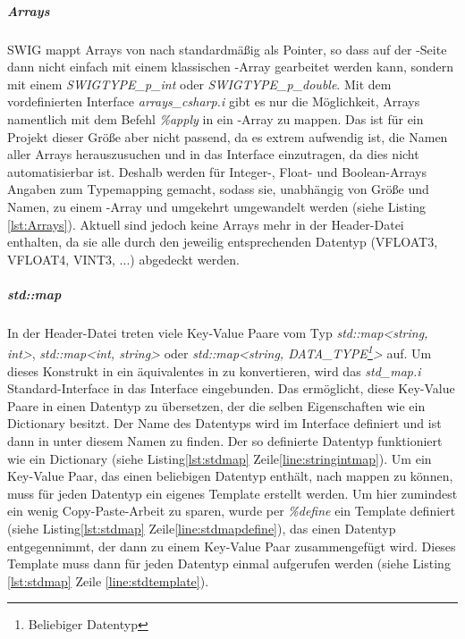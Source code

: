 \subparagraph{Arrays}
SWIG mappt Arrays von \CC nach \CS standardmäßig als Pointer, so dass auf der \CS-Seite dann nicht einfach mit einem klassischen \CS-Array gearbeitet werden kann, sondern mit einem \emph{SWIGTYPE\_p\_int} oder \emph{SWIGTYPE\_p\_double}. Mit dem vordefinierten Interface \emph{arrays\_csharp.i} gibt es nur die Möglichkeit, Arrays namentlich mit dem Befehl \emph{\%apply} in ein \CS-Array zu mappen. Das ist für ein Projekt dieser Größe aber nicht passend, da es extrem aufwendig ist, die Namen aller Arrays herauszusuchen und in das Interface einzutragen, da dies nicht automatisierbar ist. Deshalb werden für Integer-, Float- und Boolean-Arrays Angaben zum Typemapping gemacht, sodass sie, unabhängig von Größe und Namen, zu einem \CS-Array und umgekehrt umgewandelt werden (siehe Listing \ref{lst:Arrays}). Aktuell sind jedoch keine Arrays mehr in der Header-Datei enthalten, da sie alle durch den jeweilig entsprechenden Datentyp (VFLOAT3, VFLOAT4, VINT3, ...) abgedeckt werden.

\begin{code}[caption={Beispiel Arraymapping},label={lst:Arrays}, escapechar=|]
\end{code}

\subparagraph{std::map}

In der Header-Datei treten viele Key-Value Paare vom Typ \emph{std::map<string, int>}, \emph{std::map<int, string>} oder \emph{std::map<string, DATA\_TYPE\footnote{Beliebiger Datentyp}>} auf. Um dieses Konstrukt in ein äquivalentes in \CS zu konvertieren, wird das \emph{std\_map.i} Standard-Interface in das Interface eingebunden. Das ermöglicht, diese Key-Value Paare in einen Datentyp zu übersetzen, der die selben Eigenschaften wie ein \CS Dictionary besitzt. Der Name des Datentyps wird im Interface definiert und ist dann in \CS unter diesem Namen zu finden. Der so definierte Datentyp funktioniert wie ein Dictionary (siehe Listing\ref{lst:stdmap} Zeile\ref{line:stringintmap}). Um ein Key-Value Paar, das einen beliebigen Datentyp enthält, nach \CS mappen zu können, muss für jeden Datentyp ein eigenes Template erstellt werden. Um hier zumindest ein wenig Copy-Paste-Arbeit zu sparen, wurde per \emph{\%define} ein Template definiert (siehe Listing\ref{lst:stdmap} Zeile\ref{line:stdmapdefine}), das einen Datentyp entgegennimmt, der dann zu einem Key-Value Paar zusammengefügt wird. Dieses Template muss dann für jeden Datentyp einmal aufgerufen werden (siehe Listing \ref{lst:stdmap} Zeile \ref{line:stdtemplate}). 

